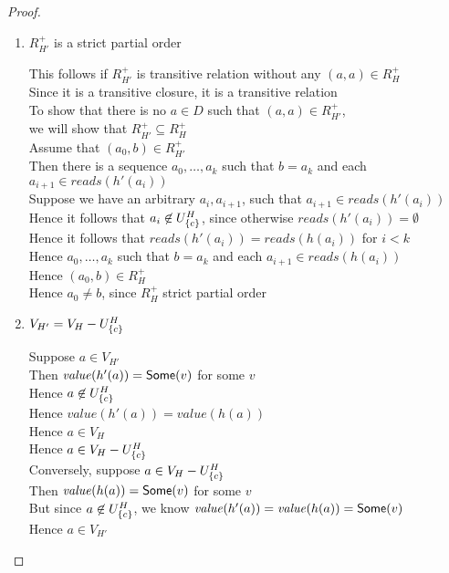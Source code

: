 \begin{proof}
\begin{enumerate}
\item $R^+_{H'}$ is a strict partial order 
  \begin{tabbedproof}
    \oo This follows if $R^+_{H'}$ is transitive relation without any $(a,a) \in R^+_H$ \\
    \oo Since it is a transitive closure, it is a transitive relation \\
    \oo To show that there is no $a \in D$ such that $(a,a) \in R^+_{H'}$, \\
    \ox we will show that $R^+_{H'} \subseteq R^+_H$ \\
    \oo Assume that $(a_0,b) \in R^+_{H'}$ \\
    \oo Then there is a sequence $a_0, \ldots, a_k$ such that $b = a_k$ and each $a_{i+1} \in \mathit{reads}(h'(a_i))$ \\
    \oo Suppose we have an arbitrary $a_i, a_{i+1}$, such that $a_{i+1} \in \mathit{reads}(h'(a_i))$ \\
    \oo Hence it follows that $a_i \not\in U^H_{\{{c}\}}$, since otherwise $\mathit{reads}(h'(a_i)) = \emptyset$ \\
    \oo Hence it follows that $\mathit{reads}(h'(a_i)) = \mathit{reads}(h(a_i))$ for $i < k$ \\
    \oo Hence $a_0, \ldots, a_k$ such that $b = a_k$ and each $a_{i+1} \in \mathit{reads}(h(a_i))$ \\
    \oo Hence $(a_0, b) \in R^+_H$ \\
    \oo Hence $a_0 \not= b$, since $R^+_H$ strict partial order 
  \end{tabbedproof}

\item $V_{H'} = V_H - U^H_{\{{c}\}}$
  \begin{tabbedproof}
    \oo Suppose $a \in V_{H'}$ \\
    \ooo Then $\mathit{value}(h'(a)) = \mathsf{Some}(v)$ for some $v$ \\
    \ooo Hence $a \not\in U^H_{\{{c}\}}$ \\
    \ooo Hence $\mathit{value}(h'(a)) = \mathit{value}(h(a))$  \\
    \ooo Hence $a \in V_H$ \\
    \ooo Hence $a \in V_{H} - U^H_{\{{c}\}}$ \\
    \oo Conversely, suppose $a \in V_{H} - U^H_{\{{c}\}}$ \\
    \ooo Then $\mathit{value}(h(a)) = \mathsf{Some}(v)$ for some $v$ \\
    \ooo But since $a \not\in U^H_{\{{c}\}}$, we know $\mathit{value}(h'(a)) = \mathit{value}(h(a)) = \mathsf{Some}(v)$ \\
    \ooo Hence $a \in V_{H'}$ 
  \end{tabbedproof}


\end{enumerate}
\end{proof}
